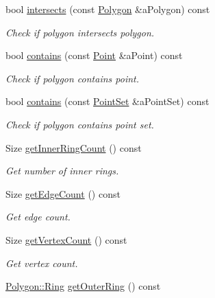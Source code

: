 \begin{DoxyCompactItemize}
bool \hyperlink{classostk_1_1math_1_1geom_1_1d2_1_1objects_1_1_polygon_ad0183cbb840fe9f1fb9dfde0cc3eae50}{intersects} (const \hyperlink{classostk_1_1math_1_1geom_1_1d2_1_1objects_1_1_polygon}{Polygon} \&a\+Polygon) const
\begin{DoxyCompactList}\small\item\em Check if polygon intersects polygon. \end{DoxyCompactList}\item 
bool \hyperlink{classostk_1_1math_1_1geom_1_1d2_1_1objects_1_1_polygon_aa9f49a046d832821a8b26064b3cf2158}{contains} (const \hyperlink{classostk_1_1math_1_1geom_1_1d2_1_1objects_1_1_point}{Point} \&a\+Point) const
\begin{DoxyCompactList}\small\item\em Check if polygon contains point. \end{DoxyCompactList}\item 
bool \hyperlink{classostk_1_1math_1_1geom_1_1d2_1_1objects_1_1_polygon_a6a95f14d1bcbc3d0231ed09f31d17045}{contains} (const \hyperlink{classostk_1_1math_1_1geom_1_1d2_1_1objects_1_1_point_set}{Point\+Set} \&a\+Point\+Set) const
\begin{DoxyCompactList}\small\item\em Check if polygon contains point set. \end{DoxyCompactList}\item 
Size \hyperlink{classostk_1_1math_1_1geom_1_1d2_1_1objects_1_1_polygon_a47930b6706bc8b54754e064f0d0ec29b}{get\+Inner\+Ring\+Count} () const
\begin{DoxyCompactList}\small\item\em Get number of inner rings. \end{DoxyCompactList}\item 
Size \hyperlink{classostk_1_1math_1_1geom_1_1d2_1_1objects_1_1_polygon_a585310d630d1e80f496a9525a308bb2b}{get\+Edge\+Count} () const
\begin{DoxyCompactList}\small\item\em Get edge count. \end{DoxyCompactList}\item 
Size \hyperlink{classostk_1_1math_1_1geom_1_1d2_1_1objects_1_1_polygon_ac53efcb8236507a884323d5db2dd5cdf}{get\+Vertex\+Count} () const
\begin{DoxyCompactList}\small\item\em Get vertex count. \end{DoxyCompactList}\item 
\hyperlink{classostk_1_1math_1_1geom_1_1d2_1_1objects_1_1_polygon_a2cfc117e0bd669946a670640eae4ee4c}{Polygon\+::\+Ring} \hyperlink{classostk_1_1math_1_1geom_1_1d2_1_1objects_1_1_polygon_a051e05d5e1a0e7e1a3e14fd7441ebbf0}{get\+Outer\+Ring} () const

\end{DoxyCompactItemize}
